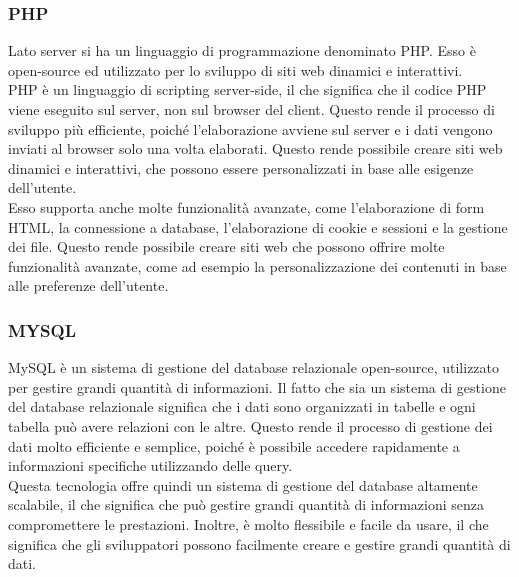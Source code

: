 \documentclass[a4paper,final,12pt]{report}
\begin{document}
\subsubsection{PHP}
Lato server si ha un linguaggio di programmazione denominato PHP. Esso è open-source ed utilizzato per lo sviluppo di siti web dinamici e interattivi. \\ PHP è un linguaggio di scripting server-side, il che significa che il codice PHP viene eseguito sul server, non sul browser del client. Questo rende il processo di sviluppo più efficiente, poiché l'elaborazione avviene sul server e i dati vengono inviati al browser solo una volta elaborati. Questo rende possibile creare siti web dinamici e interattivi, che possono essere personalizzati in base alle esigenze dell'utente. \\ Esso supporta anche molte funzionalità avanzate, come l'elaborazione di form HTML, la connessione a database, l'elaborazione di cookie e sessioni e la gestione dei file. Questo rende possibile creare siti web che possono offrire molte funzionalità avanzate, come ad esempio la personalizzazione dei contenuti in base alle preferenze dell'utente.

\subsubsection{MYSQL}
MySQL è un sistema di gestione del database relazionale open-source, utilizzato per gestire grandi quantità di informazioni. Il fatto che sia un sistema di gestione del database relazionale significa che i dati sono organizzati in tabelle e ogni tabella può avere relazioni con le altre. Questo rende il processo di gestione dei dati molto efficiente e semplice, poiché è possibile accedere rapidamente a informazioni specifiche utilizzando delle query.\\
Questa tecnologia offre quindi un sistema di gestione del database altamente scalabile, il che significa che può gestire grandi quantità di informazioni senza compromettere le prestazioni. Inoltre, è molto flessibile e facile da usare, il che significa che gli sviluppatori possono facilmente creare e gestire grandi quantità di dati.
\end{document}
